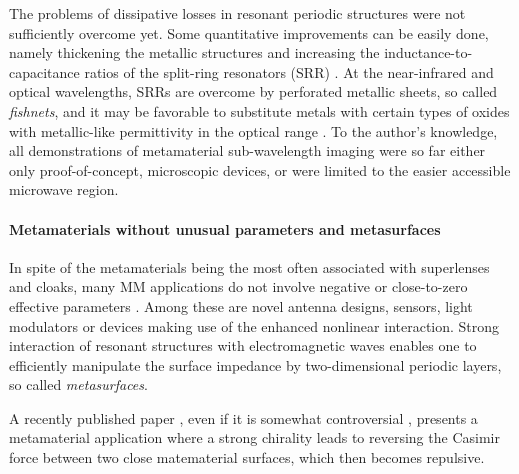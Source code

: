 The problems of dissipative losses in resonant periodic structures were not sufficiently overcome yet. Some quantitative improvements can be easily done, namely thickening the metallic structures and increasing the inductance-to-capacitance ratios of the split-ring resonators (SRR) \cite{zhou2008efficient}. At the near-infrared and optical wavelengths, SRRs are overcome by perforated metallic sheets, so called \textit{fishnets}, %
and it may be favorable to substitute metals with certain types of oxides with metallic-like permittivity in the optical range \cite{naik2011oxides}.
To the author's knowledge, all demonstrations of metamaterial sub-wavelength imaging were so far either only proof-of-concept, microscopic devices, or were limited to the easier accessible microwave region. %

\paragraph{Metamaterials without unusual parameters and metasurfaces} %
In spite of the metamaterials being the most often associated with superlenses and cloaks, many MM applications \cite{zheludev2010road} do not involve negative or close-to-zero effective parameters \cite[p. 15]{sihvola2002electromagnetic}. Among these are novel antenna designs, sensors, light modulators or devices making use of the enhanced nonlinear interaction. Strong interaction of resonant structures with electromagnetic waves enables one to efficiently manipulate the surface impedance by two-dimensional periodic layers, so called \textit{metasurfaces}. 

A recently published paper \cite{zhao2009repulsive}, even if it is somewhat controversial \cite{silveirinha2010comment}, presents a metamaterial application where a strong chirality leads to reversing the Casimir force between two close matematerial surfaces, which then becomes repulsive.

